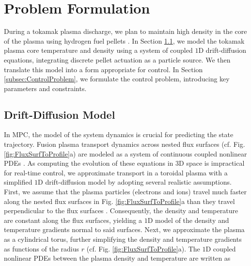 \documentclass[journal,twoside,web]{ieeecolor}
\begin{document}
\section{Problem Formulation}
\label{sec:problemFormulation}

During a tokamak plasma discharge, we plan to maintain high density in the core of the plasma using hydrogen fuel pellets \cite{Baylor2016}. In Section \ref{subsec:driftDiffusionModel}, we model the tokamak plasma core temperature and density using a system of coupled $1\textrm{D}$ drift-diffusion equations, integrating discrete pellet actuation as a particle source. We then translate this model into a form appropriate for control. In Section \ref{subsec:ControlProblem}, we formulate the control problem, introducing key parameters and constraints. 


\subsection{Drift-Diffusion Model}
\label{subsec:driftDiffusionModel}
In MPC, the model of the system dynamics is crucial for predicting the state trajectory. Fusion plasma transport dynamics across nested flux surfaces (cf. Fig. \ref{fig:FluxSurfToProfile}a) are modeled as a system of continuous coupled nonlinear PDEs \cite{Freidberg2007}. As computing the evolution of these equations in $3\textrm{D}$ space is impractical for real-time control, we approximate transport in a toroidal plasma with a simplified $1\textrm{D}$ drift-diffusion model by adopting several realistic assumptions. First, we assume that the plasma particles (electrons and ions) travel much faster along the nested flux surfaces in Fig. \ref{fig:FluxSurfToProfile}a than they travel perpendicular to the flux surfaces \cite{Freidberg2007}. Consequently, the density and temperature are constant along the flux surfaces, yielding a $1\textrm{D}$ model of the density and temperature gradients normal to said surfaces. Next, we approximate the plasma as a cylindrical torus, further simplifying the density and temperature gradients as functions of the radius $r$ (cf. Fig. \ref{fig:FluxSurfToProfile}a). The $1\textrm{D}$ coupled nonlinear PDEs between the plasma density and temperature are written as
\end{document}

